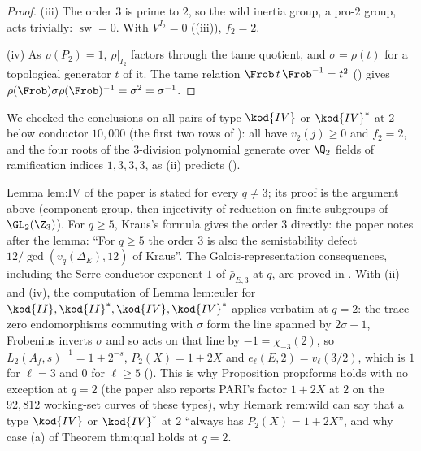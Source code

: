 \begin{proof}
(iii) The order $3$ is prime to $2$, so the wild inertia group, a pro-$2$ group, acts trivially: $\operatorname{sw}=0$. With
$V^{I_2}=0$ ((iii)), $f_2=2$.

(iv) As $\rho(P_2)=1$, $\rho|_{I_2}$ factors through the tame quotient, and $\sigma=\rho(t)$ for a topological generator $t$ of
it. The tame relation $\Frob\,t\,\Frob^{-1}=t^2$ () gives $\rho(\Frob)\sigma\rho(\Frob)^{-1}=\sigma^2=\sigma^{-1}$.
\end{proof}

We checked the conclusions on all pairs of type $\kod{IV}$ or $\kod{IV}^*$ at $2$ below conductor $10{,}000$ (the first two rows of
): all have
$v_2(j)\ge0$ and $f_2=2$, and the four roots of the $3$-division polynomial generate over $\Q_2$ fields of ramification
indices $1,3,3,3$, as (ii) predicts ().

\begin{paperlink}
Lemma lem:IV of the paper is stated for every $q\ne3$; its proof is the argument above (component group, then
injectivity of reduction on finite subgroups of $\GL_2(\Z_3)$). For $q\ge5$, Kraus's formula gives the order $3$ directly: the
paper notes after the lemma: ``For $q\ge5$ the order $3$ is also the semistability defect $12/\gcd(v_q(\Delta_E),12)$ of
Kraus''. The Galois-representation consequences, including the Serre conductor
exponent $1$ of $\bar\rho_{E,3}$ at $q$, are proved in . With (ii) and (iv), the computation of Lemma lem:euler
for $\kod{II},\kod{II}^*,\kod{IV},\kod{IV}^*$ applies verbatim at $q=2$: the trace-zero endomorphisms commuting with $\sigma$ form
the line spanned by $2\sigma+1$, Frobenius inverts $\sigma$ and so acts on that line by $-1=\chi_{-3}(2)$, so
$L_2(A_f,s)^{-1}=1+2^{-s}$, $P_2(X)=1+2X$ and $e_\ell(E,2)=v_\ell(3/2)$, which is $1$ for $\ell=3$ and $0$ for $\ell\ge5$
(). This is why Proposition prop:forms holds with no exception at $q=2$ (the paper also reports PARI's factor $1+2X$ at $2$ on the
$92{,}812$ working-set curves of these types), why Remark rem:wild can say that a type $\kod{IV}$ or $\kod{IV}^*$ at $2$
``always has $P_2(X)=1+2X$'', and why case (a) of Theorem thm:qual holds at $q=2$.
\end{paperlink}

